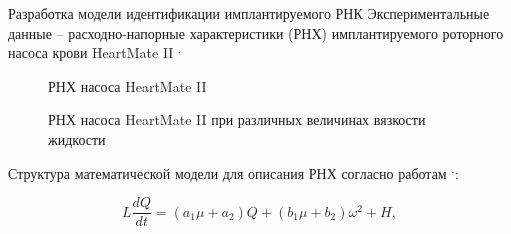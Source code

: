 \documentclass[a4paper, 9pt]{beamer}
\begin{document}
\begin{frame}{Разработка модели идентификации имплантируемого РНК}
\scriptsize
\vskip-3pt
Экспериментальные данные -- расходно-напорные характеристики (РНХ) имплантируемого роторного насоса крови HeartMate II \footnotemark[1]$^, $\footnotemark[2]
\vskip-7pt
\begin{minipage}[ht]{0.48\textwidth}
\begin{figure}
 \vskip-5pt
\caption{\scriptsize РНХ насоса HeartMate II \footnotemark[1]}
\end{figure}
\end{minipage}
\hfill
\begin{minipage}[ht]{0.48\textwidth}
\vskip2pt
\begin{figure}
 \vskip-5pt
\caption{\scriptsize РНХ насоса HeartMate II при различных величинах вязкости жидкости \footnotemark[2]}
\end{figure}

\end{minipage}
\vskip-11pt
Структура математической модели для описания РНХ согласно работам \footnotemark[3]$^, $\footnotemark[4]:

\vskip-11pt
\begin{equation}
	L\frac{dQ}{dt} = (a_1\mu+a_2)Q + (b_1\mu+b_2)\omega^2 + H,
\end{equation}


\end{frame}
\end{document}
